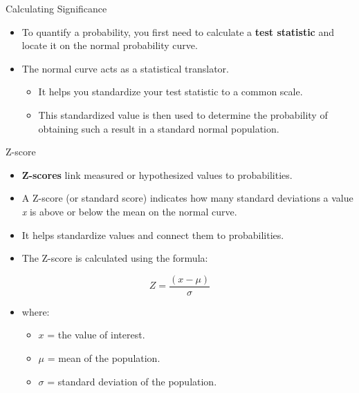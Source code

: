 \documentclass[
  ignorenonframetext,
]{beamer}
\providecommand{\tightlist}{%
  \setlength{\itemsep}{0pt}\setlength{\parskip}{0pt}}
\begin{document}
\begin{frame}{Calculating Significance}
\label{calculating-significance}
\begin{itemize}
\item
  To quantify a probability, you first need to calculate a \textbf{test
  statistic} and locate it on the normal probability curve.
\item
  The normal curve acts as a statistical translator.

  \begin{itemize}
  \tightlist
  \item
    It helps you standardize your test statistic to a common scale.
  \item
    This standardized value is then used to determine the probability of
    obtaining such a result in a standard normal population.
  \end{itemize}
\end{itemize}
\end{frame}

\begin{frame}{Z-score}
\label{z-score}
\begin{itemize}
\tightlist
\item
  \textbf{Z-scores} link measured or hypothesized values to
  probabilities.
\end{itemize}

\begin{itemize}
\tightlist
\item
  A Z-score (or standard score) indicates how many standard deviations a
  value \emph{\emph{x}} is above or below the mean on the normal curve.
\end{itemize}

\begin{itemize}
\item
  It helps standardize values and connect them to probabilities.
\item
  The Z-score is calculated using the formula:
\end{itemize}

\[ Z = \frac{(x - \mu)}{\sigma} \]

\begin{itemize}
\tightlist
\item
  where:

  \begin{itemize}
  \tightlist
  \item
    \(x\) = the value of interest.\\
  \item
    \(\mu\) = mean of the population.\\
  \item
    \(\sigma\) = standard deviation of the population.
  \end{itemize}
\end{itemize}
\end{frame}
\end{document}

